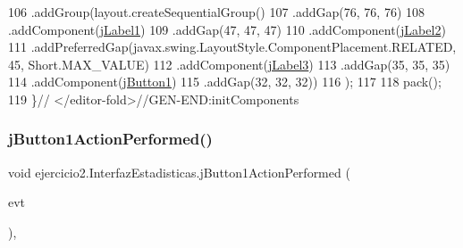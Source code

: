 \begin{DoxyCode}
106             .addGroup(layout.createSequentialGroup()
107                 .addGap(76, 76, 76)
108                 .addComponent(\mbox{\hyperlink{classejercicio2_1_1_interfaz_estadisticas_a5e051aa4c804a5eb48e3f047abce704c}{jLabel1}})
109                 .addGap(47, 47, 47)
110                 .addComponent(\mbox{\hyperlink{classejercicio2_1_1_interfaz_estadisticas_a227479001256e104ad41996508f6125e}{jLabel2}})
111                 .addPreferredGap(javax.swing.LayoutStyle.ComponentPlacement.RELATED, 45, Short.MAX\_VALUE)
112                 .addComponent(\mbox{\hyperlink{classejercicio2_1_1_interfaz_estadisticas_a7cdf095cdfd4621585f0a166faab002e}{jLabel3}})
113                 .addGap(35, 35, 35)
114                 .addComponent(\mbox{\hyperlink{classejercicio2_1_1_interfaz_estadisticas_a2e04a5a0eb4f298d827c33c859436a97}{jButton1}})
115                 .addGap(32, 32, 32))
116         );
117 
118         pack();
119     \}\textcolor{comment}{// </editor-fold>//GEN-END:initComponents}
\end{DoxyCode}
\mbox{\label{classejercicio2_1_1_interfaz_estadisticas_aa3d00a7600a56a65dcde3ab694c902db}} 
\subsubsection{\texorpdfstring{j\+Button1\+Action\+Performed()}{jButton1ActionPerformed()}}
{\footnotesize\ttfamily void ejercicio2.\+Interfaz\+Estadisticas.\+j\+Button1\+Action\+Performed (\begin{DoxyParamCaption}\item[{java.\+awt.\+event.\+Action\+Event}]{evt }\end{DoxyParamCaption})\hspace{0.3cm}{\ttfamily [inline]}, {\ttfamily [private]}}


